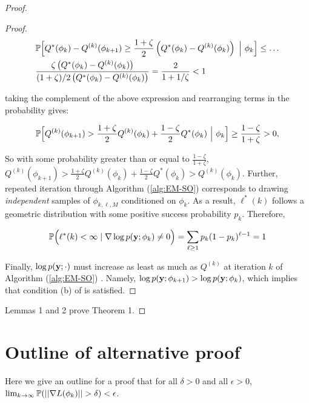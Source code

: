 \begin{proof}
\begin{proof}
\begin{align}
    & \mathbb{P} \Big[Q^*(\phi_{k}) - Q^{(k)}(\phi_{k+1}) \geq \frac{1 + \zeta}{2} \left(Q^*(\phi_{k}) - Q^{(k)}(\phi_{k}) \right) ~\Big\vert~ \phi_{k} \Big] \leq \ldots \\
    & \frac{\zeta \left( Q^*(\phi_{k}) - Q^{(k)}(\phi_k) \right)}{(1+\zeta)/2 \left( Q^*(\phi_{k}) - Q^{(k)}(\phi_k) \right)} = \frac{2}{1 + 1/\zeta} < 1
\end{align}

taking the complement of the above expression and rearranging terms in the probability gives:

\begin{equation}
    \mathbb{P} \Big[Q^{(k)}(\phi_{k+1}) > \frac{1 + \zeta}{2} Q^{(k)}(\phi_{k}) + \frac{1 - \zeta}{2} Q^*(\phi_{k}) ~\Big\vert~ \phi_{k} \Big] \geq \frac{1-\zeta}{1 + \zeta} > 0 \label{eqn:markov_ineq},
\end{equation}

So with some probability greater than or equal to $\frac{1-\zeta}{1+\zeta}$, $Q^{(k)}(\phi_{k+1}) > \frac{1 + \zeta}{2} Q^{(k)}(\phi_{k}) + \frac{1 - \zeta}{2} Q^*(\phi_{k}) > Q^{(k)}(\phi_k)$. Further, repeated iteration through Algorithm (\ref{alg:EM-SO}) corresponds to drawing \textit{independent} samples of $\phi_{k,\ell,M}$ conditioned on $\phi_k$. As a result, $\ell^*(k)$ follows a geometric distribution with some positive success probability $p_k$. Therefore, 

$$\mathbb{P}\Big(\ell^*(k) < \infty \mid \nabla \log p(\mathbf{y};\phi_k) \neq 0 \Big) = \sum_{\ell \geq 1} p_k(1-p_k)^{\ell-1} = 1$$

Finally, $\log p(\mathbf{y} ; \cdot)$ must increase as least as much as $Q^{(k)}$ at iteration $k$ of Algorithm (\ref{alg:EM-SO}) \citep{Dempster:1977}. Namely, $\log p(\mathbf{y} ; \phi_{k+1}) > \log p(\mathbf{y} ; \phi_k)$, which implies that condition (b) of \citet{Wu:1983} is satisfied.
\end{proof}

Lemmas 1 and 2 prove Theorem 1.

\end{proof}

\section{Outline of alternative proof}

Here we give an outline for a proof that for all $\delta > 0$ and all $\epsilon > 0$, $\lim_{k \to \infty} \mathbb{P}(||\nabla L (\phi_k) || > \delta) < \epsilon$.

